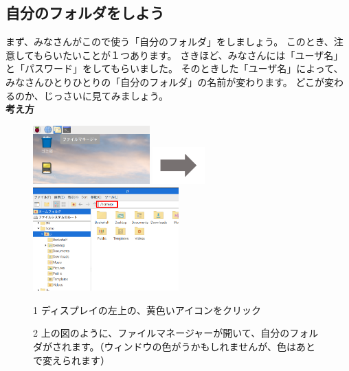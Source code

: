 \documentclass[a4paper,12pt]{jarticle}
\begin{document}
\clearpage

\subsection{\theExercise 自分のフォルダをしよう}
まず、みなさんがこので使う「自分のフォルダ」をしましょう。
このとき、注意してもらいたいことが１つあります。
さきほど、みなさんには「ユーザ名」と「パスワード」をしてもらいました。
そのときした「ユーザ名」によって、みなさんひとりひとりの「自分のフォルダ」の名前が変わります。
どこが変わるのか、じっさいに見てみましょう。\\

{\bf \large 考え方}\\
\begin{figure}[ht]
\begin{minipage}{\textwidth}
  \includegraphics[width=0.4\textwidth]{textbook-img032.png}
  \includegraphics[width=2cm]{textbook-img035.png}
  \includegraphics[width=0.5\textwidth]{textbook-img1020.png}
\end{minipage}
\begin{minipage}{0.4\textwidth}
  1
  ディスプレイの左上の、黄色いアイコンをクリック
\end{minipage}
\hspace{2cm}
\vspace{20pt}
\begin{minipage}{0.5\textwidth}
  \vspace{20pt}
  2
  上の図のように、ファイルマネージャーが開いて、自分のフォルダがされます。（ウィンドウの色がうかもしれませんが、色はあとで変えられます）
\end{minipage}
\end{figure}
\end{document}
